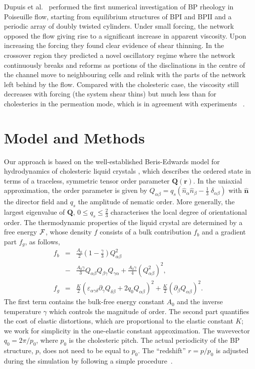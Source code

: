\documentclass[aps,pre,reprint,superscriptaddress, twocolumn]{revtex4}
\begin{document}
Dupuis et al.~\cite{Dupuis:2005} performed the first numerical investigation of BP rheology 
in Poiseuille flow, starting from equilibrium structures of BPI and BPII and a periodic 
array of doubly twisted cylinders.
Under small forcing, the network opposed the flow giving rise to a significant 
increase in apparent viscosity.
Upon increasing the forcing they found clear evidence of shear thinning.
In the crossover region they predicted a novel oscillatory regime where the network 
continuously breaks and reforms as portions of the disclinations in the centre of the channel 
move to neighbouring cells and relink with the parts of the network left behind by the flow. 
Compared with the cholesteric case, the viscosity still decreases with forcing 
(the system shear thins) but much less than
for cholesterics in the permeation mode, which is in agreement with experiments
~\cite{Zapotocky:1999, Ramos:2002}.

\section{Model and Methods}

Our approach is based on the well-established Beris-Edwards model for hydrodynamics of
cholesteric liquid crystals \cite{Beris:1994}, which describes the ordered state 
in terms of a traceless, symmetric tensor order parameter ${\mathbf Q}({\mathbf r})$. 
In the uniaxial approximation, the order parameter is given by
$Q_{\alpha \beta}= q_s ( \hat{n}_\alpha \hat{n}_\beta - \frac{1}{3}\; \delta_{\alpha\beta})$
with $\hat{{\mathbf n}}$ the director field and $q_s$ the amplitude of nematic
order. More generally,
the largest eigenvalue of ${\mathbf Q}$, $0\le q_s\le\frac{2}{3}$
characterises the local degree of orientational order.
The thermodynamic properties of the liquid crystal are determined by a free energy
${\cal F}$, whose density $f$ consists of a bulk contribution $f_b$ and a gradient part $f_g$, as follows,
\begin{eqnarray}
f_b&=&\frac{A_0}{2}\left(1-\frac{\gamma}{3}\right) Q_{\alpha \beta}^2\nonumber\\
&-&\frac{A_0 \gamma}{3}Q_{\alpha \beta} Q_{\beta \gamma} Q_{\gamma \alpha}+\frac{A_0 \gamma}{4}(Q_{\alpha \beta}^2)^2,\nonumber\\
f_g&=&\frac{K}{2}(\varepsilon_{\alpha\gamma\delta} \partial_\gamma Q_{\delta\beta}+2 q_0 Q_{\alpha \beta})^2+\frac{K}{2}(\partial_\beta Q_{\alpha \beta})^2.\label{FE}
\end{eqnarray}
The first term contains the bulk-free energy constant $A_0$ and the inverse temperature $\gamma$ which controls the magnitude of order.
The second part quantifies the cost of elastic distortions, which are proportional to the elastic constant $K$;
we work for simplicity in the one-elastic constant approximation. The wavevector $q_0=2\pi/p_0$, where $p_0$ is the cholesteric pitch.
The actual periodicity of the BP structure, $p$, does not need to be equal to $p_0$.
The ``redshift'' $r=p/p_0$ is adjusted during the simulation by following a simple procedure~\cite{Alexander:2006}.
\end{document}
